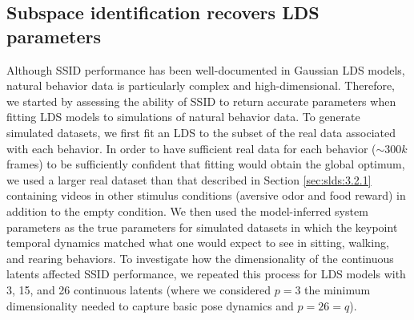 \subsection{Subspace identification recovers LDS parameters}
\label{sec:slds:3.2.6}

Although SSID performance has been well-documented in Gaussian LDS models, natural behavior data is particularly complex and high-dimensional. Therefore, we started by assessing the ability of SSID to return accurate parameters when fitting LDS models to simulations of natural behavior data. To generate simulated datasets, we first fit an LDS to the subset of the real data associated with each behavior. In order to have sufficient real data for each behavior ($\sim300k$ frames) to be sufficiently confident that fitting would obtain the global optimum, we used a larger real dataset than that described in Section \ref{sec:slds:3.2.1} containing videos in other stimulus conditions (aversive odor and food reward) in addition to the empty condition. We then used the model-inferred system parameters as the true parameters for simulated datasets in which the keypoint temporal dynamics matched what one would expect to see in sitting, walking, and rearing behaviors. To investigate how the dimensionality of the continuous latents affected SSID performance, we repeated this process for LDS models with 3, 15, and 26 continuous latents (where we considered $p=3$ the minimum dimensionality needed to capture basic pose dynamics and  $p=26=q$). 
